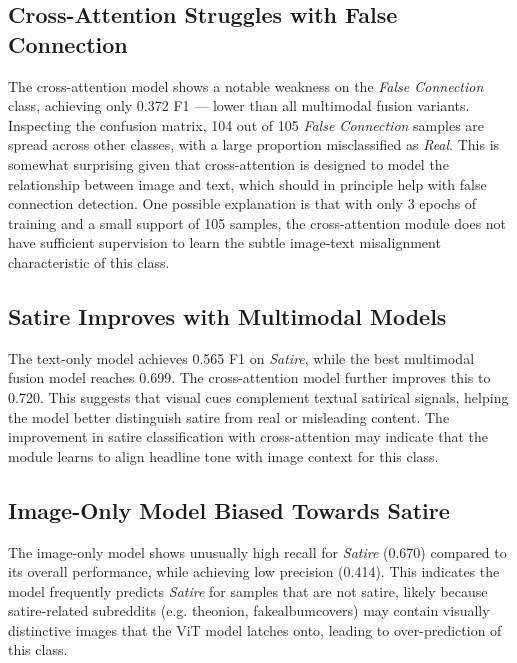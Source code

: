 \subsection{Cross-Attention Struggles with False Connection}

The cross-attention model shows a notable weakness on the \textit{False Connection} class, achieving only 0.372 F1 — lower than all multimodal fusion variants. Inspecting the confusion matrix, 104 out of 105 \textit{False Connection} samples are spread across other classes, with a large proportion misclassified as \textit{Real}. This is somewhat surprising given that cross-attention is designed to model the relationship between image and text, which should in principle help with false connection detection. One possible explanation is that with only 3 epochs of training and a small support of 105 samples, the cross-attention module does not have sufficient supervision to learn the subtle image-text misalignment characteristic of this class.

\subsection{Satire Improves with Multimodal Models}

The text-only model achieves 0.565 F1 on \textit{Satire}, while the best multimodal fusion model reaches 0.699. The cross-attention model further improves this to 0.720. This suggests that visual cues complement textual satirical signals, helping the model better distinguish satire from real or misleading content. The improvement in satire classification with cross-attention may indicate that the module learns to align headline tone with image context for this class.

\subsection{Image-Only Model Biased Towards Satire}

The image-only model shows unusually high recall for \textit{Satire} (0.670) compared to its overall performance, while achieving low precision (0.414). This indicates the model frequently predicts \textit{Satire} for samples that are not satire, likely because satire-related subreddits (e.g. theonion, fakealbumcovers) may contain visually distinctive images that the ViT model latches onto, leading to over-prediction of this class.
